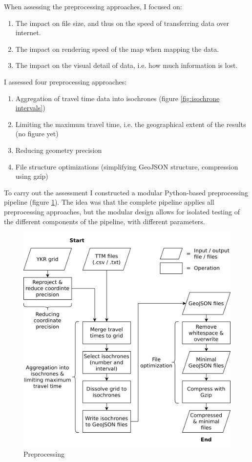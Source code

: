 When assessing the preprocessing approaches, I focused on:
\begin{enumerate}
	\item The impact on file size, and thus on the speed of transferring data over internet.
	\item The impact on rendering speed of the map when mapping the data.
	\item The impact on the visual detail of data,
	i.e. how much information is lost.
\end{enumerate}

I assessed four preprocessing approaches:
\begin{enumerate}
	\item Aggregation of travel time data into isochrones (figure \ref{fig:isochrone intervals})
	\item Limiting the maximum travel time, i.e. the geographical extent of the results (no figure yet)
	\item Reducing geometry precision
	\item File structure optimizations (simplifying GeoJSON structure, compression using gzip)
\end{enumerate}

To carry out the assessment
I constructed a modular Python-based preprocessing pipeline
(figure \ref{fig:preprocessing}).
The idea was that the complete pipeline applies all preprocessing approaches,
but the modular design allows for
isolated testing of the
different components of the pipeline, with different parameters.

\begin{figure}[H]
	\centering
	\includegraphics[width=\diagramwidth]{visual/figures/diagrams/preprocessing.png}
	\caption{Preprocessing}
	\label{fig:preprocessing}
\end{figure}

